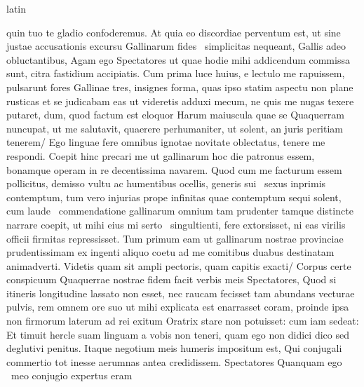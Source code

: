 \documentclass[12pt]{book}
\renewenvironment{latin}
    	{\begin{hyphenrules}{latin}}
    	{\end{hyphenrules}}
\begin{document}
\begin{pages}
\begin{latin}
\begin{Leftside}
                    quin tuo te gladio confoderemus. 
                    At quia eo discordiae perventum est, ut sine justae accusationis excursu Gallinarum fides  \ampersand\ simplicitas  nequeant, Gallis  adeo obluctantibus, 
                    Agam ego Spectatores ut quae hodie mihi addicendum commissa sunt, citra   fastidium accipiatis. 
                    Cum prima luce  huius, e lectulo  me rapuissem, pulsarunt fores Gallinae tres, insignes forma, quas ipso statim aspectu non plane rusticas et se judicabam eas 
                    ut videretis adduxi mecum, ne quis me nugas texere putaret, 
                    dum, quod factum est eloquor Harum maiuscula quae se Quaquerram nuncupat, ut me salutavit, quaerere  perhumaniter, ut solent, an juris peritiam tenerem/ 
                    Ego linguae fere omnibus ignotae novitate oblectatus, tenere me respondi. 
                    Coepit hinc precari me ut gallinarum hoc die patronus essem, bonamque operam in re decentissima navarem. 
                    Quod cum me facturum essem pollicitus, demisso vultu ac humentibus ocellis, generis sui  \ampersand\ sexus inprimis contemptum, 
                    tum vero injurias prope infinitas quae contemptum sequi solent, cum laude  \ampersand\ commendatione gallinarum omnium tam prudenter tamque distincte narrare coepit, 
                    ut mihi eius mi serto  \ampersand\ singultienti, fere  extorsisset, ni eas virilis officii firmitas repressisset. 
                    Tum primum eam ut gallinarum nostrae provinciae prudentissimam ex ingenti aliquo coetu ad me comitibus duabus destinatam animadverti. 
                    Videtis quam sit ampli pectoris, quam capitis exacti/ 
                    Corpus certe conspicuum Quaquerrae nostrae fidem facit verbis meis Spectatores, Quod si itineris longitudine lassato non esset, 
                    nec raucam fecisset tam abundans vecturae pulvis, rem omnem ore suo ut mihi explicata est enarrasset coram, 
                    proinde ipsa non firmorum laterum ad rei exitum Oratrix stare non potuisset: 
                    cum iam sedeat: 
                    Et timuit hercle suam linguam a vobis non teneri, quam ego non didici dico sed deglutivi penitus. 
                    Itaque negotium meis humeris impositum est, 
                    Qui conjugali commertio tot inesse aerumnas  antea credidissem. Spectatores Quanquam ego   \ampersand\ meo conjugio expertus eram 

\end{Leftside}
\end{latin}
\end{pages}
\end{document}
